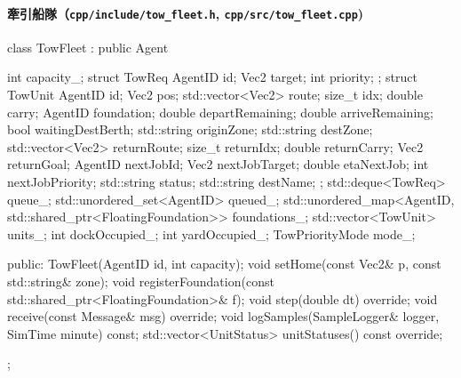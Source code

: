 \documentclass[10pt,letterpaper]{jsarticle}
\begin{document}
\paragraph{牽引船隊（\texttt{cpp/include/tow\_fleet.h}, \texttt{cpp/src/tow\_fleet.cpp})}
\begin{cppcode}
class TowFleet : public Agent {
    int capacity_;
    struct TowReq { AgentID id; Vec2 target; int priority; };
    struct TowUnit {
        AgentID id;
        Vec2 pos;
        std::vector<Vec2> route;
        size_t idx;
        double carry;
        AgentID foundation;
        double departRemaining;
        double arriveRemaining;
        bool waitingDestBerth;
        std::string originZone;
        std::string destZone;
        std::vector<Vec2> returnRoute;
        size_t returnIdx;
        double returnCarry;
        Vec2 returnGoal;
        AgentID nextJobId;
        Vec2 nextJobTarget;
        double etaNextJob;
        int nextJobPriority;
        std::string status;
        std::string destName;
    };
    std::deque<TowReq> queue_;
    std::unordered_set<AgentID> queued_;
    std::unordered_map<AgentID, std::shared_ptr<FloatingFoundation>> foundations_;
    std::vector<TowUnit> units_;
    int dockOccupied_;
    int yardOccupied_;
    TowPriorityMode mode_;

public:
    TowFleet(AgentID id, int capacity);
    void setHome(const Vec2& p, const std::string& zone);
    void registerFoundation(const std::shared_ptr<FloatingFoundation>& f);
    void step(double dt) override;
    void receive(const Message& msg) override;
    void logSamples(SampleLogger& logger, SimTime minute) const;
    std::vector<UnitStatus> unitStatuses() const override;
};
\end{cppcode}
\end{document}
